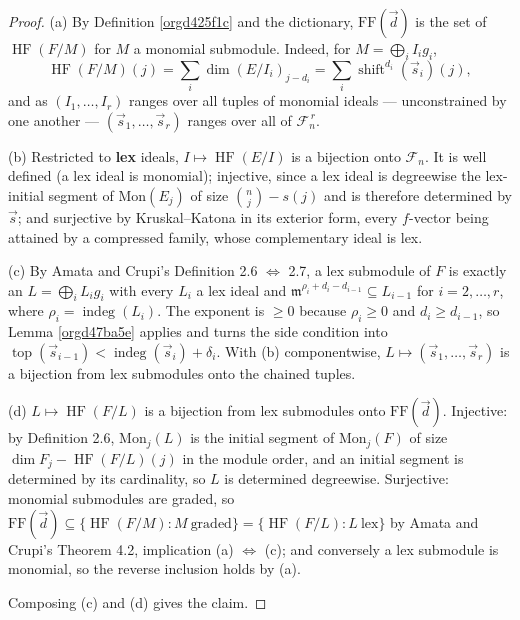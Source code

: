 \documentclass[11pt, a4paper, abstract=yes]{scrartcl}
\theoremstyle{definition}
\theoremstyle{remark}
\theoremstyle{plain}
\newcommand{\vek}[1]{\boldsymbol{#1}}
\newcommand{\shift}{\operatorname{shift}}
\newcommand{\indeg}{\operatorname{indeg}}
\newcommand{\tp}{\operatorname{top}}
\newcommand{\HF}{\operatorname{HF}}
\renewcommand{\vek}[1]{\vec{#1}}
\begin{document}
\begin{proof}
(a) By Definition \ref{orgd425f1c} and the dictionary, \(\mathrm{FF}(\vek d)\) is the set of \(\HF(F/M)\)
for \(M\) a monomial submodule. Indeed, for \(M=\bigoplus_iI_ig_i\),
\[
  \HF(F/M)(j)=\sum_i\dim(E/I_i)_{j-d_i}=\sum_i\shift^{d_i}(\vek s_i)(j) ,
\]
and as \((I_1,\dots,I_r)\) ranges over all tuples of monomial ideals --- unconstrained by one
another --- \((\vek s_1,\dots,\vek s_r)\) ranges over all of \(\mathcal F_n^{\,r}\).

(b) Restricted to \textbf{lex} ideals, \(I\mapsto\HF(E/I)\) is a bijection onto \(\mathcal F_n\). It is well
defined (a lex ideal is monomial); injective, since a lex ideal is degreewise the lex-initial segment
of \(\mathrm{Mon}(E_j)\) of size \(\binom nj-s(j)\) and is therefore determined by \(\vek s\); and
surjective by Kruskal--Katona in its exterior form, every \(f\)-vector being attained by a compressed
family, whose complementary ideal is lex.

(c) By Amata and Crupi's Definition 2.6 \(\Leftrightarrow\) 2.7, a lex submodule of \(F\) is exactly
an \(L=\bigoplus_iL_ig_i\) with every \(L_i\) a lex ideal and
\(\mathfrak m^{\rho_i+d_i-d_{i-1}}\subseteq L_{i-1}\) for \(i=2,\dots,r\), where
\(\rho_i=\indeg(L_i)\). The exponent is \(\ge0\) because \(\rho_i\ge0\) and \(d_i\ge d_{i-1}\), so
Lemma \ref{orgd47ba5e} applies and turns the side condition into
\(\tp(\vek s_{i-1})<\indeg(\vek s_i)+\delta_i\). With (b) componentwise, \(L\mapsto(\vek s_1,\dots,\vek s_r)\) is a
bijection from lex submodules onto the chained tuples.

(d) \(L\mapsto\HF(F/L)\) is a bijection from lex submodules onto \(\mathrm{FF}(\vek d)\). Injective: by
Definition 2.6, \(\mathrm{Mon}_j(L)\) is the initial segment of \(\mathrm{Mon}_j(F)\) of size
\(\dim F_j-\HF(F/L)(j)\) in the module order, and an initial segment is determined by its
cardinality, so \(L\) is determined degreewise. Surjective: monomial submodules are graded, so
\(\mathrm{FF}(\vek d)\subseteq\lbrace\HF(F/M):M\ \text{graded}\rbrace=\lbrace\HF(F/L):L\ \text{lex}\rbrace\)
by Amata and Crupi's Theorem 4.2, implication (a) \(\Leftrightarrow\) (c); and conversely a lex
submodule is monomial, so the reverse inclusion holds by (a).

Composing (c) and (d) gives the claim.
\end{proof}
\end{document}

